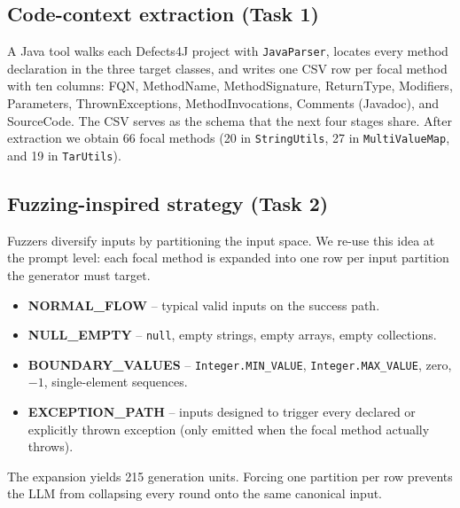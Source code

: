 \documentclass[conference]{IEEEtran}
\begin{document}
\subsection{Code-context extraction (Task 1)}
A Java tool walks each Defects4J project with \texttt{JavaParser}, locates
every method declaration in the three target classes, and writes one CSV
row per focal method with ten columns: FQN, MethodName, MethodSignature,
ReturnType, Modifiers, Parameters, ThrownExceptions, MethodInvocations,
Comments (Javadoc), and SourceCode. The CSV serves as the schema that
the next four stages share. After extraction we obtain 66 focal methods
(20 in \texttt{StringUtils}, 27 in \texttt{MultiValueMap}, and 19 in
\texttt{TarUtils}).

\subsection{Fuzzing-inspired strategy (Task 2)}
\label{sec:approach-strategy}
Fuzzers diversify inputs by partitioning the input space. We re-use this
idea at the prompt level: each focal method is expanded into one row per
input partition the generator must target.

\begin{itemize}
  \item \textbf{NORMAL\_FLOW} -- typical valid inputs on the success
        path.
  \item \textbf{NULL\_EMPTY} -- \texttt{null}, empty strings, empty
        arrays, empty collections.
  \item \textbf{BOUNDARY\_VALUES} -- \texttt{Integer.MIN\_VALUE},
        \texttt{Integer.MAX\_VALUE}, zero, $-1$, single-element
        sequences.
  \item \textbf{EXCEPTION\_PATH} -- inputs designed to trigger every
        declared or explicitly thrown exception (only emitted when the
        focal method actually throws).
\end{itemize}

The expansion yields 215 generation units. Forcing one partition per row
prevents the LLM from collapsing every round onto the same canonical
input.
\end{document}
